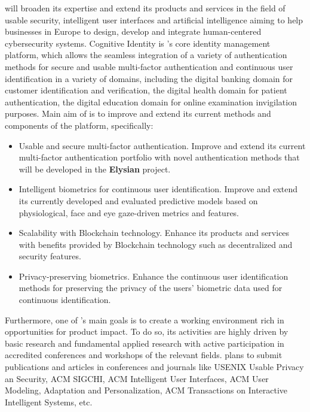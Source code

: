 \documentclass[a4paper,11pt]{article}
\newcommand{\project}[1]{\textbf{#1}\xspace}
\newcommand{\SECURITY}{\project{Elysian}}
\newcommand{\TheProject}{\SECURITY}
\begin{document}
\COGNIshort{} will broaden its expertise and extend its products and services in the field of usable security, intelligent user interfaces and artificial intelligence aiming to help businesses in Europe to design, develop and integrate human-centered cybersecurity systems.
%
Cognitive Identity is \COGNIshort{}'s core identity management platform, which allows the seamless integration of a variety of authentication methods for secure and usable multi-factor authentication and continuous user identification in a variety of domains, including the digital banking domain for customer identification and verification, the digital health domain for patient authentication, the digital education domain for online examination invigilation purposes. Main aim of \COGNIshort{} is to improve and extend its current methods and components of the platform, specifically:

\begin{itemize}
    \item Usable and secure multi-factor authentication. Improve and extend its current multi-factor authentication portfolio with novel authentication methods that will be developed in the \TheProject project.
    \item Intelligent biometrics for continuous user identification. Improve and extend its currently developed and evaluated predictive models based on physiological, face and eye gaze-driven metrics and features.
    \item Scalability with Blockchain technology. Enhance its products
    and services with benefits provided by Blockchain technology such as decentralized and security features.
    \item Privacy-preserving biometrics. Enhance the continuous user identification methods for preserving the privacy of the users' biometric data used for continuous identification.
\end{itemize}

Furthermore, one of \COGNIshort{}'s main goals is to create a working environment rich in opportunities for product impact. To do so, its activities are highly driven by basic research and fundamental applied research with active participation in accredited conferences and workshops of the relevant fields. \COGNIshort{} plans to submit publications and articles in conferences and journals like USENIX Usable Privacy an Security, ACM SIGCHI, ACM Intelligent User Interfaces, ACM User Modeling, Adaptation and Personalization, ACM Transactions on Interactive Intelligent Systems, etc.
\end{document}
